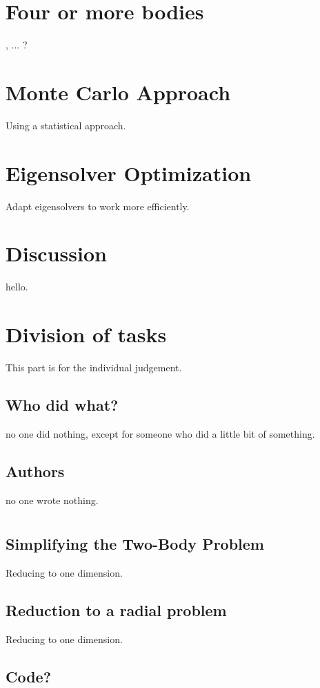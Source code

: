 \documentclass[12pt,a4paper]{report}
\begin{document}
\chapter{Four or more bodies} %
\label{cha:four_or_more_bodies}

,  ... ?


\chapter{Monte Carlo Approach}
\label{cha:monte_carlo_approach}

Using a statistical approach.

\chapter{Eigensolver Optimization}
\label{cha: eigensolver}

Adapt eigensolvers to work more efficiently.

\chapter{Discussion}
\label{discussion}

hello.

\chapter{Division of tasks}
\label{division}
This part is for the individual judgement.

\section{Who did what?}
no one did nothing, except for someone who did a little bit of something.
\section{Authors}
no one wrote nothing.

\appendix

\chapter{}

\section{Simplifying the Two-Body Problem} %
\label{sec:the_two_body_problem}

Reducing to one dimension.


\section{Reduction to a radial problem} %
\label{sec:reduction_to_a_radial_problem}

Reducing to one dimension.



\section{Code?} %
\label{sec:code}

\end{document}
